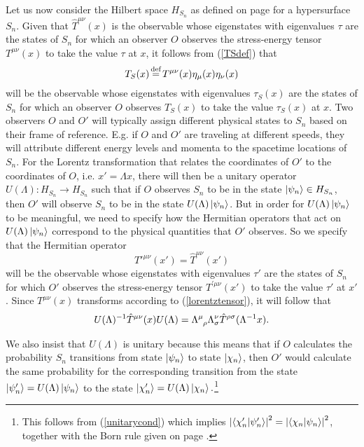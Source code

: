 Let us now consider the Hilbert space $H_{S_n}$ as defined on page \pageref{HSidef} for a hypersurface $S_n$. 
Given that $\hat{T}^{\mu\nu}(x)$ is the observable whose eigenstates with eigenvalues $\tau$ are the states of $S_n$ for which an observer $O$ observes the stress-energy tensor $T^{\mu\nu}(x)$ to take the value $\tau$ at $x$, it follows from (\ref{TSdef}) that 
\begin{equation}\label{TShat}
	T_S(x)\myeq T^{\mu\nu}(x)\eta_{\mu}(x)\eta_{\nu}(x)
	\end{equation}
	will be the observable whose eigenstates with eigenvalues $\tau_S(x)$ are the states of $S_n$ for which an observer $O$ observes $T_S(x)$ to take the value $\tau_S(x)$ at $x$.
Two observers $O$ and $O'$ will typically assign different physical states to $S_n$ based on their frame of reference. E.g. if $O$ and $O'$ are traveling at different speeds, they will attribute different energy levels and momenta to the spacetime locations of $S_n$. For the Lorentz transformation that relates the coordinates of $O'$ to the coordinates of $O$, i.e. $x'=\Lambda x$,  there  will then be a unitary operator $U(\Lambda):H_{S_n}\rightarrow H_{S_n}$ such that if
$O$ observes  $S_n$ to be in the state $\ket{\psi_n}\in H_{S_n}$, then $O'$ will observe $S_n$ to be in the state $U(\Lambda)\ket{\psi_n}$. But in order for $U(\Lambda)\ket{\psi_n}$ to be meaningful, we need to specify how the Hermitian operators that act on $U(\Lambda)\ket{\psi_n}$ correspond to the physical quantities that $O'$ observes. So we specify that the Hermitian operator 
\begin{equation}\label{Thatprime}
\hat{T}'^{\mu\nu}(x')=\hat{T}^{\mu\nu}(x')
\end{equation}
will be the observable whose eigenstates with eigenvalues $\tau'$ are the states of $S_n$ for which $O'$ observes the stress-energy tensor $T^{\prime\mu\nu}(x')$ to take the value $\tau'$ at $x'$. Since $T^{\mu\nu}(x)$ transforms according to (\ref{lorentztensor}), it will follow that
\begin{equation}\label{TUrelation}
U(\Lambda)^{-1}\hat{T}^{\mu\nu}(x)U(\Lambda)=\Lambda\indices{^\mu_\rho}\Lambda{^\nu_\sigma}\hat{T}^{\rho\sigma}(\Lambda^{-1}x).
\end{equation}

We also insist that $U(\Lambda)$ is unitary because this means that if $O$ calculates the probability $S_n$ transitions from state $\ket{\psi_n}$ to state $\ket{\chi_n}$, then $O'$ would calculate the same probability for the corresponding transition from the state $\ket{\psi_n'}=U(\Lambda)\ket{\psi_n}$ to the state $\ket{\chi_n'}=U(\Lambda)\ket{\chi_n}.$\footnote{This follows from (\ref{unitarycond}) which implies 
$\abs{\ip{\chi'_n}{\psi'_n}}^2=\abs{\ip{\chi_n}{\psi_n}}^2$, together with the Born rule given on page \pageref{bornrule}.}

